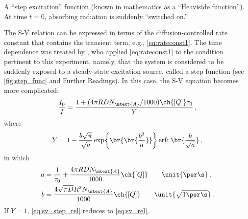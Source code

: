 \documentclass[nobib,nofonts,nols,nohyper]{tufte-handout}
\begin{document}
\begin{marginfigure}[-3\baselineskip]
	\centering
	\caption{A ``step excitation'' function (known in mathematics as a ``Heaviside function''). At time \( t = 0 \), absorbing radiation is suddenly ``switched on.''}
	\label{fig:step_func}
\end{marginfigure}
The S-V relation can be expressed in terms of the diffusion-controlled rate constant that contains the transient term, e.g., \cref{eq:rateconst1}. 
The time dependence was treated by \textcite{ware66}, who applied \cref{eq:rateconst1} to the condition pertinent to this experiment, namely, that the system is considered to be suddenly exposed to a steady-state excitation source, called a step function (see \cref{fig:step_func} and Further Readings). 
In this case, the S-V equation becomes more complicated:
\begin{equation}
	\frac{I_0}{I} = \frac{1 + (4 \pi R D N_\mtext{A} / 1000) \ch{[Q]} \tau_0}{Y} \, ,
	\label{eq:sv_step_rel}
\end{equation}
where
\begin{equation}
	Y = 1 - \frac{b \sqrt{\pi}}{\sqrt{a}} \exp\br{\br{ \frac{b^2}{a} }} \erfc\br{ \frac{b}{\sqrt{a}} } \, ,
	\label{eq:sv_y}
\end{equation}
in which 
\begin{align*}
	a &= \frac{1}{\tau_0} + \frac{4 \pi R D N_\mtext{A}}{1000} \ch{[Q]} \qquad \unit{\per\s} \, ,\\
	b &= \frac{4 \sqrt{\pi D} R^2 N_\mtext{A}}{1000} \ch{[Q]} \qquad \unit{\sqrt{1\per\s}}\, .
\end{align*}
If \( Y = 1 \), \cref{eq:sv_step_rel} reduces to \cref{eq:sv_rel},%
\end{document}
